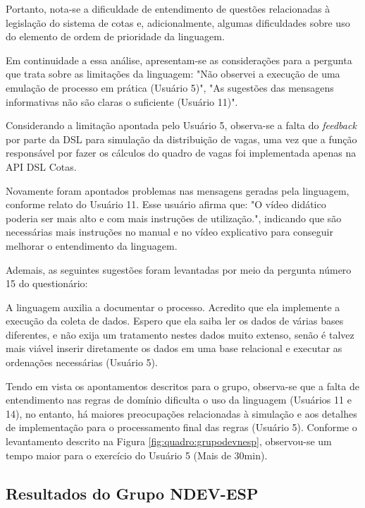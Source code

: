 Portanto, nota-se a dificuldade de entendimento de questões relacionadas à legislação do sistema de cotas e, adicionalmente, algumas dificuldades sobre uso do elemento de ordem de prioridade da linguagem. 

Em continuidade a essa análise, apresentam-se as considerações para a pergunta que trata sobre as limitações da linguagem: "Não observei a execução de uma emulação de processo em prática (Usuário 5)", "As sugestões das mensagens informativas não são claras o suficiente (Usuário 11)".

Considerando a limitação apontada pelo Usuário 5, observa-se a falta do \textit{feedback} por parte da DSL para simulação da distribuição de vagas, uma vez que a função responsável por fazer os cálculos do quadro de vagas foi implementada apenas na API DSL Cotas. 

Novamente foram apontados problemas nas mensagens geradas pela linguagem, conforme relato do Usuário 11. Esse usuário afirma que: "O vídeo didático poderia ser mais alto e com mais instruções de utilização.", indicando que são necessárias mais instruções no manual e no vídeo explicativo para conseguir melhorar o entendimento da linguagem. 

Ademais, as seguintes sugestões foram levantadas por meio da pergunta número 15 do questionário:

\begin{citacao}
A linguagem auxilia a documentar o processo. Acredito que ela implemente a execução da coleta de dados. Espero que ela saiba ler os dados de várias bases diferentes, e não exija um tratamento nestes dados muito extenso, senão é talvez mais viável inserir diretamente os dados em uma base relacional e executar as ordenações necessárias (Usuário 5).
\end{citacao}

Tendo em vista os apontamentos descritos para o grupo, observa-se que a falta de entendimento nas regras de domínio dificulta o uso da linguagem (Usuários 11 e 14), no entanto, há maiores preocupações relacionadas à simulação e aos detalhes de implementação para o processamento final das regras (Usuário 5). Conforme o levantamento descrito na Figura \ref{fig:quadro:grupodevnesp},  observou-se um tempo maior para o exercício do Usuário 5 (Mais de 30min).






\newpage
\subsection{Resultados do Grupo NDEV-ESP}
\label{subsec:ndevesp}

